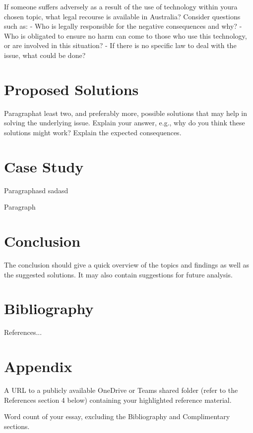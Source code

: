 \documentclass[12pt,a4paper]{article}
\begin{document}
If someone suffers adversely as a result of the use of technology within youra chosen topic, what legal recourse is
available in Australia? Consider questions such as:
- Who is legally responsible for the negative consequences and why?
- Who
is obligated to ensure no harm can come to those who use this technology, or are involved
in this situation?
- If there
is no specific law to deal with the issue, what could be done?


\section{Proposed Solutions}

Paragraphat least two, and preferably more, possible solutions that may help in solving the underlying issue. Explain
your answer, e.g., why do you think these solutions might work? Explain the expected consequences.


\section{Case Study}

Paragraphasd sadasd

Paragraph


\section{Conclusion}

The conclusion should give a quick overview of the topics and findings as well as the suggested solutions. It may also contain suggestions for future analysis.


\section{Bibliography}

References...


\section{Appendix}

A URL to a publicly available OneDrive or Teams shared folder (refer to the References section 4 below) containing your highlighted reference material.

Word count of your essay, excluding the Bibliography and Complimentary sections.

\end{document}
